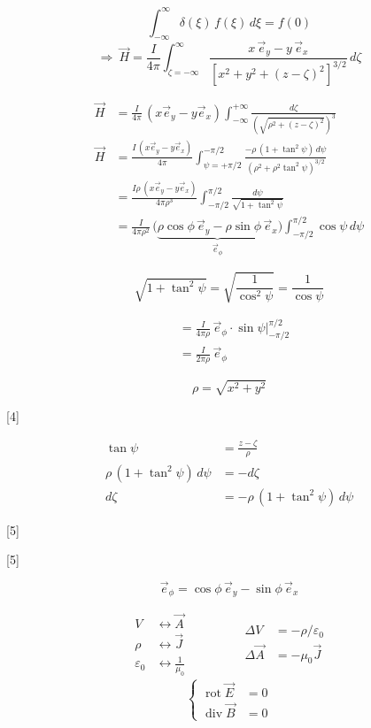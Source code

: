 \documentclass[11pt,a4paper]{article}
\begin{document}
\[ \int_{-\infty}^{\infty}\delta(\xi)\,f(\xi)\,d\xi = f(0) \]
\[ \Rightarrow\ \vec{H} = \frac{I}{4\pi}\int_{\zeta=-\infty}^{\infty}\frac{x\,\vec{e}_y - y\,\vec{e}_x}{\left[x^2+y^2+(z-\zeta)^2\right]^{3/2}}\, d\zeta \]

\begin{align*}
  \vec{H} &= \frac{I}{4\pi}\,(x\vec{e}_y - y\vec{e}_x)\int_{-\infty}^{+\infty}\frac{d\zeta}{\left(\sqrt{\rho^2+(z-\zeta)^2}\right)^3} \\
  \vec{H} &= \frac{I\,(x\vec{e}_y - y\vec{e}_x)}{4\pi}\int_{\psi=+\pi/2}^{-\pi/2}\frac{-\rho\,(1+\tan^2\psi)\,d\psi}{(\rho^2+\rho^2\tan^2\psi)^{3/2}} \\
  &= \frac{I\rho\,(x\vec{e}_y - y\vec{e}_x)}{4\pi\rho^3}\int_{-\pi/2}^{\pi/2}\frac{d\psi}{\sqrt{1+\tan^2\psi}} \\
  &= \frac{I}{4\pi\rho^2}\,\bigl(\underbrace{\rho\cos\phi\,\vec{e}_y - \rho\sin\phi\,\vec{e}_x}_{\vec{e}_\phi}\bigr)\int_{-\pi/2}^{\pi/2}\cos\psi\, d\psi
\end{align*}

\[ \sqrt{1+\tan^2\psi} = \sqrt{\frac{1}{\cos^2\psi}} = \frac{1}{\cos\psi} \]

\begin{align*}
  &= \frac{I}{4\pi\rho}\,\vec{e}_\phi\cdot\sin\psi\Big|_{-\pi/2}^{\pi/2} \\
  &= \frac{I}{2\pi\rho}\,\vec{e}_\phi
\end{align*}

\[ \rho = \sqrt{x^2+y^2} \]

[4]

\begin{align*}
  \tan\psi &= \frac{z-\zeta}{\rho} \\
  \rho\,(1+\tan^2\psi)\,d\psi &= -d\zeta \\
  d\zeta &= -\rho\,(1+\tan^2\psi)\,d\psi
\end{align*}

[5]

[5]

\[ \vec{e}_\phi = \cos\phi\,\vec{e}_y - \sin\phi\,\vec{e}_x \]

\[ \begin{aligned} V &\longleftrightarrow \vec{A} \\ \rho &\longleftrightarrow \vec{J} \\ \varepsilon_0 &\longleftrightarrow \frac{1}{\mu_0} \end{aligned} \qquad\qquad \begin{aligned} \Delta V &= -\rho/\varepsilon_0 \\ \Delta\vec{A} &= -\mu_0\vec{J} \end{aligned} \]
\[ \left\{ \begin{aligned} \operatorname{rot}\vec{E} &= 0 \\ \operatorname{div}\vec{B} &= 0 \end{aligned} \right. \]
\end{document}
